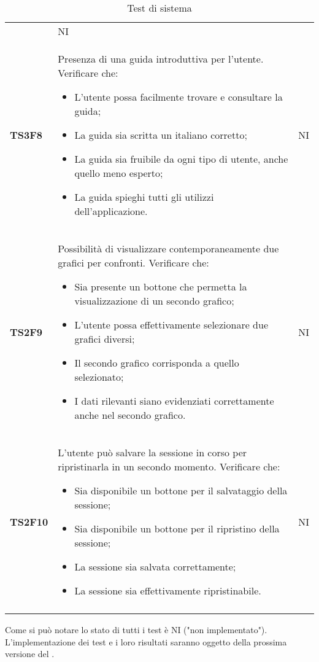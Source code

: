 \begin{longtable}{C{2cm} C{12cm} C{1.5cm}}
			   & NI \\
			   
\textbf{TS3F8} & Presenza di una guida introduttiva per l'utente. Verificare che:
					\begin{itemize}
						\item L'utente possa facilmente trovare e consultare la guida;
						\item La guida sia scritta un italiano corretto;
						\item La guida sia fruibile da ogni tipo di utente, anche quello meno esperto; 
						\item La guida spieghi tutti gli utilizzi dell'applicazione.
					\end{itemize}
			   & NI \\
\textbf{TS2F9} & Possibilità di visualizzare contemporaneamente due grafici per confronti. Verificare che: 
					\begin{itemize}
						\item Sia presente un bottone che permetta la visualizzazione di un secondo grafico;
						\item L'utente possa effettivamente selezionare due grafici diversi;
						\item Il secondo grafico corrisponda a quello selezionato;
						\item I dati rilevanti siano evidenziati correttamente anche nel secondo grafico.
					\end{itemize}	
			   & NI \\
\textbf{TS2F10} & L'utente può salvare la sessione in corso per ripristinarla in un secondo momento. Verificare che: 
					\begin{itemize}
						\item Sia disponibile un bottone per il salvataggio della sessione; 
						\item Sia disponibile un bottone per il ripristino della sessione;
						\item La sessione sia salvata correttamente;
						\item La sessione sia effettivamente ripristinabile.
					\end{itemize}	
			   & NI \\
			   
			   \caption{Test di sistema}
\label{testSistema}
\end{longtable}
Come si può notare lo stato di tutti i test è NI ("non implementato"). L'implementazione dei test e i loro risultati saranno oggetto della prossima versione del \PdQv{}.

